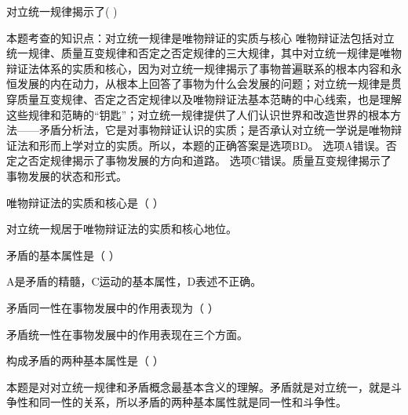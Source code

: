 \question 对立统一规律揭示了( )
\par{}
\begin{solution}本题考查的知识点：对立统一规律是唯物辩证的实质与核心
唯物辩证法包括对立统一规律、质量互变规律和否定之否定规律的三大规律，其中对立统一规律是唯物辩证法体系的实质和核心，因为对立统一规律揭示了事物普遍联系的根本内容和永恒发展的内在动力，从根本上回答了事物为什么会发展的问题；对立统一规律是贯穿质量互变规律、否定之否定规律以及唯物辩证法基本范畴的中心线索，也是理解这些规律和范畴的``钥匙''；对立统一规律提供了人们认识世界和改造世界的根本方法------矛盾分析法，它是对事物辩证认识的实质；是否承认对立统一学说是唯物辩证法和形而上学对立的实质。所以，本题的正确答案是选项BD。
选项A错误。否定之否定规律揭示了事物发展的方向和道路。
选项C错误。质量互变规律揭示了事物发展的状态和形式。
\end{solution}
\question 唯物辩证法的实质和核心是（ ）
\par{}
\begin{solution}对立统一规居于唯物辩证法的实质和核心地位。
\end{solution}
\question 矛盾的基本属性是（ ）
\par{}
\begin{solution}A是矛盾的精髓，C运动的基本属性，D表述不正确。
\end{solution}
\question 矛盾同一性在事物发展中的作用表现为（ ）
\par{}
\begin{solution}矛盾统一性在事物发展中的作用表现在三个方面。
\end{solution}
\question 构成矛盾的两种基本属性是（ ）
\par{}
\begin{solution}本题是对对立统一规律和矛盾概念最基本含义的理解。矛盾就是对立统一，就是斗争性和同一性的关系，所以矛盾的两种基本属性就是同一性和斗争性。
\end{solution}
